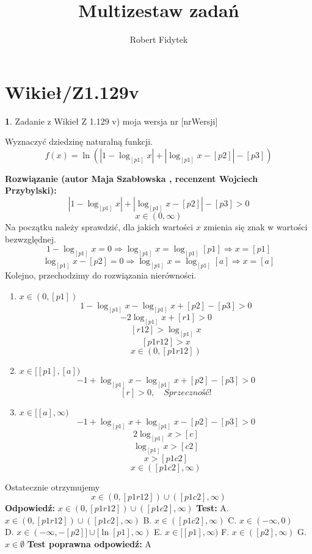 \documentclass[12pt, a4paper]{article}
\title{Multizestaw zadań}
\author{Robert Fidytek}
\date{}
\theoremstyle{definition} %
\newtheorem{zad}{}
\newcommand{\kategoria}[1]{\section{#1}} %
\newcommand{\zadStart}[1]{\begin{zad}#1\newline} %
\newcommand{\zadStop}{\end{zad}}   %
\newcommand{\rozwStart}[2]{\noindent \textbf{Rozwiązanie (autor #1 , recenzent #2): }\newline} %
\newcommand{\rozwStop}{\newline}                                            %
\newcommand{\odpStart}{\noindent \textbf{Odpowiedź:}\newline}    %
\newcommand{\odpStop}{\newline}                                             %
\newcommand{\testStart}{\noindent \textbf{Test:}\newline} %
\newcommand{\testStop}{\newline} %
\newcommand{\kluczStart}{\noindent \textbf{Test poprawna odpowiedź:}\newline} %
\newcommand{\kluczStop}{\newline} %
\begin{document}
\maketitle


\kategoria{Wikieł/Z1.129v}
\zadStart{Zadanie z Wikieł Z 1.129 v) moja wersja nr [nrWersji]}


Wyznaczyć dziedzinę naturalną funkcji.
$$f(x)=\ln(|1-\log_{[p1]}x|+|\log_{[p1]}x-[p2]|-[p3])$$
\zadStop

\rozwStart{Maja Szabłowska}{Wojciech Przybylski}
$$|1-\log_{[p1]}x|+|\log_{[p1]}x-[p2]|-[p3]>0$$
$$x\in(0,\infty)$$
Na początku należy sprawdzić, dla jakich wartości $x$ zmienia się znak w wartości bezwzględnej.
$$1-\log_{[p1]}x=0 \Rightarrow \log_{[p1]}x=\log_{[p1]}[p1] \Rightarrow x=[p1]$$
$$\log_{[p1]}x-[p2]=0 \Rightarrow \log_{[p1]}x=\log_{[p1]}[a]\Rightarrow x=[a]$$
Kolejno, przechodzimy do rozwiązania nierówności.
\begin{enumerate}
    \item $x\in(0, [p1])$
    $$1-\log_{[p1]}x-\log_{[p1]}x+[p2]-[p3]>0$$
    $$-2\log_{[p1]}x+[r1]>0$$
    $$[r12]>\log_{[p1]}x$$
    $$[p1r12]>x$$
    $$x\in(0, [p1r12])$$
    
    \item $x\in[[p1],[a])$
    $$-1+\log_{[p1]}x-\log_{[p1]}x+[p2]-[p3]>0$$
    $$[r]>0, \quad \textit{Sprzeczność!}$$
    
    \item $x\in [[a],\infty)$
    $$-1+\log_{[p1]}x+\log_{[p1]}x-[p2]-[p3]>0$$
    $$2\log_{[p1]}x>[c]$$
    $$\log_{[p1]}x>[c2]$$
    $$x>[p1c2]$$
    $$x\in([p1c2],\infty)$$
\end{enumerate}
Ostatecznie otrzymujemy
$$x\in(0, [p1r12])\cup([p1c2],\infty)$$
\rozwStop
\odpStart
$x\in(0, [p1r12])\cup([p1c2],\infty)$
\odpStop
\testStart
A. $x\in(0, [p1r12])\cup([p1c2],\infty)$
B. $x\in([p1c2],\infty)$
C. $x\in(-\infty, 0)$\\
D. $x\in(-\infty, -[p2]] \cup [\ln[p1],\infty)$
E. $x\in[[p1],\infty)$
F. $x\in([p2],\infty)$
G. $x\in\emptyset$
\testStop
\kluczStart
A
\kluczStop
\end{document}
